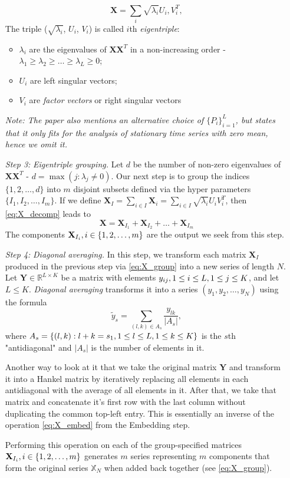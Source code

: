 \begin{itemize}
\begin{equation}
		\mathbf{X}=\sum_i\sqrt{\lambda_i}U_i,V_i^T
		\label{X_SVD},
	\end{equation}
	The triple ($\sqrt{\lambda_i}$, $U_i$, $V_i$) is called $i$th
	\textit{eigentriple}:
	\begin{itemize}
		\item $\lambda_i$ are the eigenvalues of $\mathbf{X}\mathbf{X}^T$ in a
		non-increasing order -
		$\lambda_1\ge\lambda_2\ge\ldots\ge\lambda_L\ge 0$;
		\item $U_i$ are left singular vectors;
		\item $V_i$ are \textit{factor vectors} or right singular vectors
	\end{itemize}
	\textit{Note: The paper also mentions an alternative choice of
	$\{P_i\}_{i=1}^L$, but states that it only fits for the analysis of
	stationary time series with zero mean, hence we omit it.}
	\item[\textit{Step 3:}] \textit{Eigentriple grouping.} Let $d$ be the number
	of non-zero eigenvalues of $\mathbf{X}\mathbf{X}^T$ -
	$d=\max(j:\lambda_j\neq 0)$. Our next step is to group the indices
	$\{1,2,\ldots,d\}$ into $m$ disjoint subsets defined via the hyper 
	parameters $\{I_1,I_2,\ldots,I_m\}$. If we define $\mathbf{X}_I=\sum_{i\in
	I}\mathbf{X}_i=\sum_{i\in I}\sqrt{\lambda_i}U_iV_i^T$, then
	\ref{eq:X_decomp} leads to
	\begin{equation}
		\mathbf{X}=\mathbf{X}_{I_1}+\mathbf{X}_{I_2}+\ldots+\mathbf{X}_{I_m}
		\label{eq:X_group}
	\end{equation}
	The components $\mathbf{X}_{I_i},\space i\in\{1,2,\ldots,m\}$ are the output
	we seek from this step.
	\item[\textit{Step 4:}] \textit{Diagonal averaging.} In this step, we
	transform each matrix $\mathbf{X}_I$ produced in the previous step via
	\ref{eq:X_group} into a new series of length $N$. Let
	$\mathbf{Y}\in\mathbb{R}^{L\times K}$ be a matrix with elements $y_{ij},1\le
	i\le L,\space 1\le j\le K$, and let $L\le K$. \textit{Diagonal averaging}
	transforms it into a series $(y_1,y_2,\ldots,y_N)$ using the formula
	\begin{equation}
		\tilde{y}_s=\sum_{(l,k)\in A_s}\frac{y_{lk}}{|A_s|}
		\label{eq:y_tilde},
	\end{equation}
	where $A_s=\{(l,k):l+k=s_1,\space 1\le l\le L,\space 1\le k\le K\}$ is the
	$s$th "antidiagonal" and $|A_s|$ is the number of elements in it.

	Another way to look at it that we take the original matrix $\mathbf{Y}$ and
	transform it into a Hankel matrix by iteratively replacing all elements in
	each antidiagonal with the average of all elements in it. After that, we
	take that matrix and concatenate it's first row with the last column without
	duplicating the common top-left entry. This is essentially an inverse of the
	operation \ref{eq:X_embed} from the Embedding step.

	Performing this operation on each of the group-specified matrices
	$\mathbf{X}_{I_i},\space i\in\{1,2,\ldots,m\}$ generates $m$ series
	representing $m$ components that form the original series $\mathbb{X}_N$
	when added back together (see \ref{eq:X_group}).
\end{itemize}

